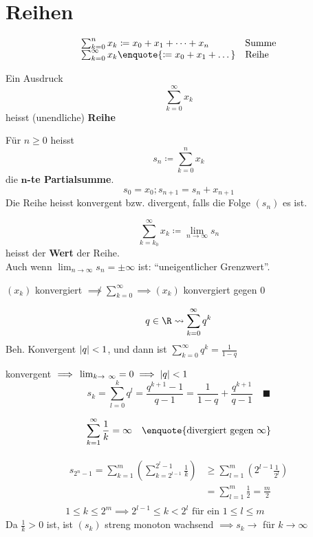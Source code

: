 \section{Reihen}
\[\begin{matrix*}[l]
	\sum_{k=0}^n x_k \coloneqq x_0 + x_1 + \dots + x_n	&\text{Summe}	\\
	\sum_{k=0}^\infty x_k \enquote{\coloneqq x_0 + x_1 + \dots}	&\text{Reihe}	
\end{matrix*}\]

\begin{def*}[note = Reihe , index = Reihe]
	Ein Ausdruck
	\[ \sum_{k=0}^\infty x_k \]
	heisst (unendliche) \textbf{Reihe}
\end{def*}
\begin{def*}[note = Partialsumme , index = Partialsumme]
	Für $n \geq 0$ heisst
	\[ s_n \coloneqq \sum_{k=0}^n x_k \]
	die \textbf{$\mathbf{n}$-te Partialsumme}.
	\[ s_0 = x_0 ; s_{n+1} = s_n + x_{n+1} \]
	Die Reihe heisst konvergent bzw. divergent, falls die Folge $(s_n)$ es ist.
\end{def*}
\begin{def*}[note = Wert , index = Reihe!Wert]
	\[ \sum_{k=k_0}^\infty x_k \coloneqq \lim_{n \rightarrow \infty} s_n \]
	heisst der \textbf{Wert} der Reihe. \\
	Auch wenn $\lim_{n \rightarrow \infty} s_n = \pm \infty$ ist: \enquote{uneigentlicher Grenzwert}.
\end{def*}
\begin{bem}
	$(x_k)$ konvergiert $\not\implies \sum_{k=0}^\infty \implies (x_k)$ konvergiert gegen $0$ \quad [Da $x_k = s_k - s_{k-1}$]
\end{bem}
\begin{bsp*}
	\[ q \in \R \rightsquigarrow \sum_{k=0}^\infty q^k \]
	Beh. Konvergent \gdw $\abs{q} < 1$, und dann ist $\sum_{k=0}^\infty q^k = \frac{1}{1-q}$ \\
	\begin{bew}
		konvergent $\implies \lim_{k \rightarrow \infty} = 0 \implies \abs{q} < 1$
		\[ s_k = \sum_{l=0}^k q^l = \frac{q^{k+1} - 1}{q-1} = \frac{1}{1-q} + \frac{q^{k+1}}{q-1} \quad \blacksquare \]
	\end{bew}
\end{bsp*}
\begin{bsp*}[note = Harmonische Reihe]
	\[ \sum_{k=1}^\infty \frac{1}{k} = \infty \quad \enquote{\text{divergiert gegen } \infty} \]
	\begin{bew}
		 \begin{gather*}
		 	\begin{split}
				s_{2^n-1} = \sum_{k=1}^m \left( \sum_{k=2^{l-1}}^{2^l - 1} \frac{1}{k} \right)	&\geq \sum_{l=1}^m \left( 2^{l-1} \frac{1}{2^l} \right) \\
																		&= \sum_{l=1}^m \frac{1}{2} = \frac{m}{2}
			\end{split} \\
			 1 \leq k \leq 2^m \implies 2^{l-1} \leq k < 2^l \text{ für ein } 1 \leq l \leq m
		\end{gather*}
		Da $\frac{1}{k} > 0$ ist, ist $(s_k)$ streng monoton wachsend $\implies s_k \rightarrow$ für $k \rightarrow \infty$
	\end{bew}
\end{bsp*}
